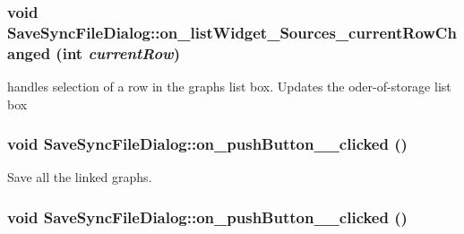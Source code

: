 \hypertarget{class_save_sync_file_dialog_d9d1632dcbc20ea628be9646e42a6d39}{
\subsubsection[{on\_\-listWidget\_\-Sources\_\-currentRowChanged}]{\setlength{\rightskip}{0pt plus 5cm}void SaveSyncFileDialog::on\_\-listWidget\_\-Sources\_\-currentRowChanged (int {\em currentRow})}}
\label{class_save_sync_file_dialog_d9d1632dcbc20ea628be9646e42a6d39}


handles selection of a row in the graphs list box. Updates the oder-of-storage list box 

\hypertarget{class_save_sync_file_dialog_1266fb9559a260bd06123a8f9d057c71}{
\subsubsection[{on\_\-pushButton\_\-2\_\-clicked}]{\setlength{\rightskip}{0pt plus 5cm}void SaveSyncFileDialog::on\_\-pushButton\_\_\-clicked ()}}
\label{class_save_sync_file_dialog_1266fb9559a260bd06123a8f9d057c71}


Save all the linked graphs. 

\hypertarget{class_save_sync_file_dialog_d2c4963b1665d3c34636934a2d3260c9}{
\subsubsection[{on\_\-pushButton\_\-3\_\-clicked}]{\setlength{\rightskip}{0pt plus 5cm}void SaveSyncFileDialog::on\_\-pushButton\_\_\-clicked ()}}
\label{class_save_sync_file_dialog_d2c4963b1665d3c34636934a2d3260c9}


